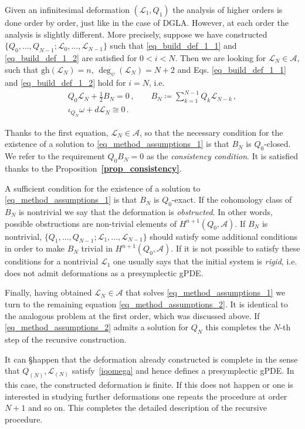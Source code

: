 \documentclass[a4paper,12pt]{article}
\numberwithin{equation}{section} %
\renewcommand{\simeq}{\cong}
\newcommand{\bref}[1]{\textbf{\ref{#1}}}
\newcommand{\gh}[1]{\mathrm{gh}(#1)}
\newcommand{\algA}{\mathcal{A}}
\def\cL{\mathcal{L}}
\newcommand{\h}{\cL}
\begin{document}
Given an infinitesimal deformation $(\cL_1,Q_1)$ the analysis of higher orders is done order by order, just like in the case of DGLA. However, at each order the analysis is slightly different. More precisely, suppose we have constructed $\{ Q_0,\dots,Q_{N-1}; \h_0,\dots,\h_{N-1} \}$ such that \eqref{eq_build_def_1_1} and \eqref{eq_build_def_1_2} are satisfied for $0<i<N$. Then we are looking for $\h_N \in \algA$, such that  $ \gh{\h_N} = n $, $ \deg_\psi(\h_N) = N+2 $ and  Eqs.  \eqref{eq_build_def_1_1} and \eqref{eq_build_def_1_2} hold for $i=N$, i.e. 
	\begin{gather}
    \label{eq_method_assumptions_1}
		Q_0 \h_N+\frac{1}{2} B_N = 0\,, \qquad
        B_N \coloneq \sum_{k=1}^{N-1} Q_k \h_{N-k}\,,\\
		\iota_{Q_N} \omega + d \h_N \simeq 0\,.
        \label{eq_method_assumptions_2}
	\end{gather}

	
Thanks to the first equation, $\h_N \in \algA$, so that the necessary condition for the existence of a solution to \eqref{eq_method_assumptions_1} is that $B_N$ is $Q_0$-closed. We refer to the requirement $Q_0 B_N=0$ as the \textit{consistency condition}. It is satisfied thanks to the Proposition~\bref{prop_consistency}.


A sufficient condition for the existence of a solution to \eqref{eq_method_assumptions_1} is that $B_N$ is $Q_0$-exact. If the cohomology class of $B_N$ is nontrivial we say that the deformation is \textit{obstructed}. In other words, possible obstructions are non-trivial elements of $H^{n+1}(Q_0,\mathcal{A})$. If $B_N$ is nontrivial, $\{ Q_1,\dots,Q_{N-1}; \h_1,\dots,\h_{N-1} \}$ should satisfy some additional conditions in order to make $B_N$ trivial in $H^{n+1}(Q_0,\mathcal{A})$. If it is not possible to satisfy these conditions for a nontrivial $\cL_1$ one usually says that the initial system is {\textit{rigid}}, i.e. does not admit  deformations as a presymplectic gPDE.

Finally, having obtained $\cL_N \in \algA$ that solves \eqref{eq_method_assumptions_1} we turn to the remaining equation \eqref{eq_method_assumptions_2}. It is identical to the analogous problem at the first order, which was discussed above. 
If \eqref{eq_method_assumptions_2} admits a solution for $Q_N$ this completes the $N$-th step of the recursive construction. 


It can §happen that the deformation already constructed is complete in the sense that $Q_{(N)},\cL_{(N)}$ satisfy~\eqref{iqomega} and hence defines a presymplectic gPDE. In this case, the constructed deformation is finite.  If this does not happen or one is interested in studying further deformations one repeats the procedure at order $N+1$ and so on. This completes the detailed description of the recursive procedure. 
\end{document}
